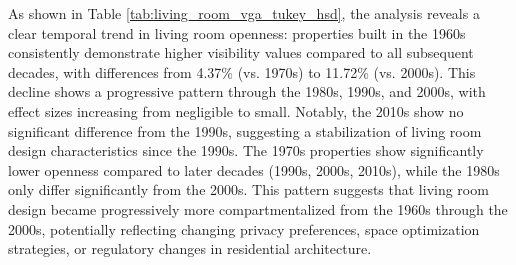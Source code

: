As shown in Table \ref{tab:living_room_vga_tukey_hsd}, the analysis reveals a clear temporal trend in living room openness: properties built in the 1960s 
consistently demonstrate higher visibility values compared to all subsequent decades, with differences 
from 4.37\% (vs. 1970s) to 11.72\% (vs. 2000s). This decline shows a progressive pattern through the 
1980s, 1990s, and 2000s, with effect sizes increasing from negligible to small. Notably, the 2010s 
show no significant difference from the 1990s, suggesting a stabilization of living room design 
characteristics since the 1990s. The 1970s properties show significantly lower openness compared to 
later decades (1990s, 2000s, 2010s), while the 1980s only differ significantly from the 2000s. This 
pattern suggests that living room design became progressively more compartmentalized from the 1960s 
through the 2000s, potentially reflecting changing privacy preferences, space optimization strategies, 
or regulatory changes in residential architecture.

